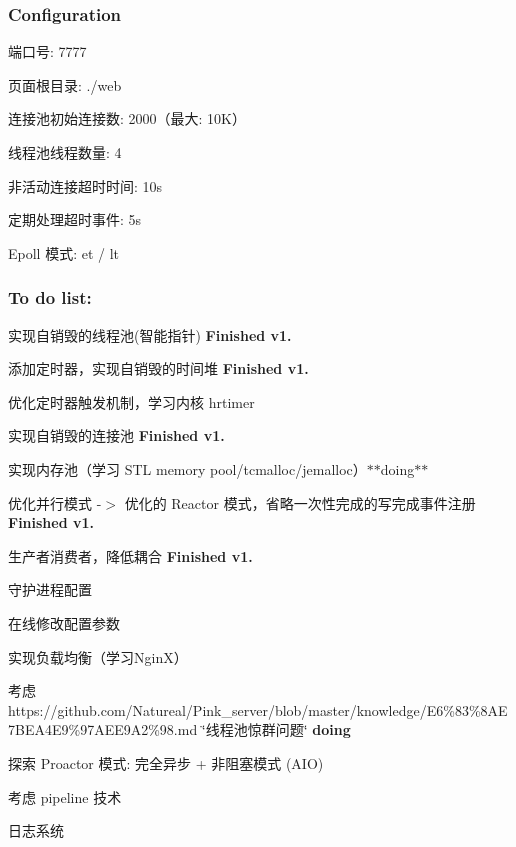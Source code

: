 \subsubsection*{Configuration}


\begin{DoxyItemize}
\item 端口号\+: 7777
\item 页面根目录\+: ./web
\item 连接池初始连接数\+: 2000（最大\+: 10\+K）
\item 线程池线程数量\+: 4
\item 非活动连接超时时间\+: 10s
\item 定期处理超时事件\+: 5s
\item Epoll 模式\+: et / lt 


\end{DoxyItemize}

\subsubsection*{To do list\+:}


\begin{DoxyEnumerate}
\item 实现自销毁的线程池(智能指针) {\bfseries Finished v1.}
\item 添加定时器，实现自销毁的时间堆 {\bfseries Finished v1.}
\item 优化定时器触发机制，学习内核 hrtimer
\item 实现自销毁的连接池 {\bfseries Finished v1.}
\item 实现内存池（学习 S\+TL memory pool/tcmalloc/jemalloc）$\ast$$\ast$doing$\ast$$\ast$
\item 优化并行模式 -\/$>$ 优化的 Reactor 模式，省略一次性完成的写完成事件注册 {\bfseries Finished v1.}
\item 生产者消费者，降低耦合 {\bfseries Finished v1.}
\item 守护进程配置
\item 在线修改配置参数
\item 实现负载均衡（学习\+Ngin\+X）
\item 考虑https\+://github.com/\+Natureal/\+Pink\+\_\+server/blob/master/knowledge/E6\%83\%8AE7BEA4E9\%97AEE9A2\%98.\+md \char`\"{}线程池惊群问题\char`\"{} {\bfseries doing}
\item 探索 Proactor 模式\+: 完全异步 + 非阻塞模式 (A\+IO)
\item 考虑 pipeline 技术
\item 日志系统 
\end{DoxyEnumerate}